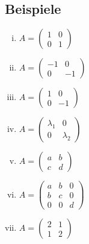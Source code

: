 \documentclass[11pt,a4paper]{book}
\newcommand{\1}    	{\mathbbm{1}}
\begin{document}
\subsection{Beispiele}
\begin{enumerate}[(i)]
	\item \(A = \left( \begin{array}{cc}
		1 & 0 \\
		0 & 1
	\end{array} \right) \)
	\item \(A = \left( \begin{array}{cc}
		-1 & 0 \\
		0 & -1
	\end{array} \right) \)
	\item \(A = \left( \begin{array}{cc}
		1 & 0 \\
		0 & -1
	\end{array} \right) \)
	\item \(A = \left( \begin{array}{cc}
		\lambda_1 & 0 \\
		0 & \lambda_2
	\end{array} \right) \)
	\item \(A = \left( \begin{array}{cc}
		a & b \\
		c & d
	\end{array} \right) \)
	\item \(A = \left( \begin{array}{ccc}
		a & b & 0 \\
		b & c & 0 \\
		0 & 0 & d
	\end{array} \right) \)
	\item \(A = \left( \begin{array}{cc}
		2 & 1 \\
		1 & 2
	\end{array} \right) \)
\end{enumerate}
\end{document}
